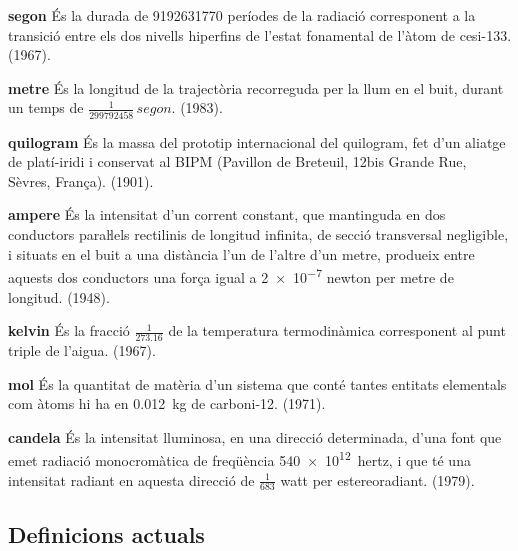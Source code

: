 \begin{list}{}
   {\setlength{\labelwidth}{22mm} \setlength{\leftmargin}{22mm} \setlength{\labelsep}{2mm}}
   \item[\textbf{segon}] És la durada de \num{9192631770} períodes de la
   radiació corresponent a la transició entre els dos nivells
  hiperfins de l'estat fonamental de l'àtom de cesi-133. (1967).
   \item[\textbf{metre}] És la longitud de la trajectòria recorreguda per la llum
   en el buit, durant un temps de $\frac{1}{\num{299792458}}\unit{\,segon}$. (1983).
   \item[\textbf{quilogram}] És la massa del prototip internacional del quilogram, fet d'un aliatge de platí-iridi i
    conservat al BIPM (Pavillon de Breteuil,  12bis Grande Rue, Sèvres, França). (1901).
   \item[\textbf{ampere}] És la intensitat d'un corrent constant,
   que mantinguda en dos conductors paraŀlels rectilinis de longitud
   infinita, de secció transversal negligible, i situats en el buit a una
   distància l'un de l'altre d'un metre, produeix entre
   aquests dos conductors  una força igual a \num{2e-7} newton per metre de longitud. (1948).
   \item[\textbf{kelvin}] És la fracció $\frac{1}{\num{273,16}}$ de la temperatura
   termodinàmica corresponent al punt triple de l'aigua. (1967).
   \item[\textbf{mol}] És la quantitat de matèria d'un sistema que conté tantes
   entitats elementals com àtoms hi ha en \qty{0,012}{kg} de carboni-12. (1971).
   \item[\textbf{candela}] És la intensitat lluminosa, en una direcció determinada,
   d'una font que emet radiació monocromàtica de freqüència \qty{540e12}{hertz}, i
   que té una intensitat radiant en aquesta direcció de $\frac{1}{683}$ watt per estereoradiant. (1979).
\end{list}

\subsection{Definicions actuals}

